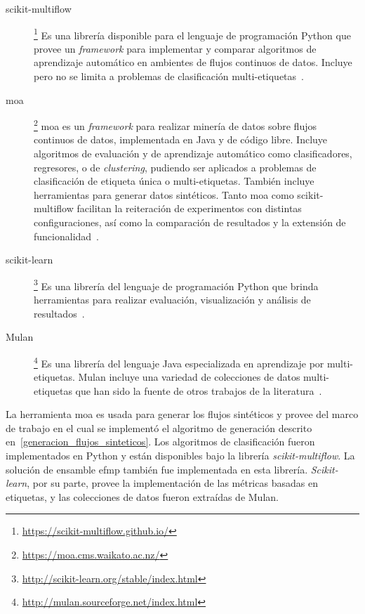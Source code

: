 \begin{description}

	\item[scikit-multiflow]\footnote{\url{https://scikit-multiflow.github.io/}}
	      Es una librería disponible para el lenguaje de programación Python que
	      provee un \textit{framework} para implementar y comparar algoritmos de
	      aprendizaje automático en ambientes de flujos continuos de datos.
	      Incluye pero no se limita a problemas de clasificación
	      multi-etiquetas~\cite{montiel_scikit-multiflow_2018}.

	\item[\acrshort{moa}]\footnote{\url{https://moa.cms.waikato.ac.nz/}}
	      \acrfull{moa} es un \textit{framework} para realizar minería de datos
	      sobre flujos continuos de datos, implementada en Java y de código libre.
	      Incluye algoritmos de evaluación y de aprendizaje automático como
	      clasificadores, regresores, o de \textit{clustering}, pudiendo ser
	      aplicados a problemas de clasificación de etiqueta única o
	      multi-etiquetas.  También incluye herramientas para generar datos
	      sintéticos. Tanto \acrshort{moa} como scikit-multiflow facilitan la
	      reiteración de experimentos con distintas configuraciones, así como la
	      comparación de resultados y la extensión de
	      funcionalidad~\cite{bifet_moa_2010}.

	\item[scikit-learn]\footnote{\url{http://scikit-learn.org/stable/index.html}}
	      Es una librería del lenguaje de programación Python que brinda
	      herramientas para realizar evaluación, visualización y análisis de
	      resultados~\cite{pedregosa_scikit-learn_2018}.

	\item[Mulan]\footnote{\url{http://mulan.sourceforge.net/index.html}} Es una
	      librería del lenguaje Java especializada en aprendizaje por
	      multi-etiquetas. Mulan incluye una variedad de colecciones de datos
	      multi-etiquetas que han sido la fuente de otros trabajos de la
	      literatura~\cite{tsoumakas_mulan_2011}.

\end{description}

La herramienta \acrshort{moa} es usada para generar los flujos sintéticos y
provee del marco de trabajo en el cual se implementó el algoritmo de generación
descrito en~\ref{generacion_flujos_sinteticos}. Los algoritmos de clasificación
fueron implementados en Python y están disponibles bajo la librería
\textit{scikit-multiflow}. La solución de ensamble \acrshort{efmp} también fue
implementada en esta librería. \textit{Scikit-learn}, por su parte, provee la
implementación de las métricas basadas en etiquetas, y las colecciones de datos
fueron extraídas de Mulan.

